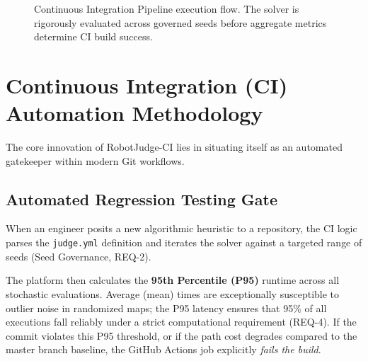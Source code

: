 \documentclass[conference]{IEEEtran}
\begin{document}
\begin{figure}[htbp]
\centering
{}
\caption{Continuous Integration Pipeline execution flow. The solver is rigorously evaluated across governed seeds before aggregate metrics determine CI build success.}
\label{fig:flowchart}
\end{figure}

\section{Continuous Integration (CI) Automation Methodology}
The core innovation of RobotJudge-CI lies in situating itself as an automated gatekeeper within modern Git workflows. 

\subsection{Automated Regression Testing Gate}
When an engineer posits a new algorithmic heuristic to a repository, the CI logic parses the \texttt{judge.yml} definition and iterates the solver against a targeted range of seeds (Seed Governance, REQ-2). 

The platform then calculates the \textbf{95th Percentile (P95)} runtime across all stochastic evaluations. Average (mean) times are exceptionally susceptible to outlier noise in randomized maps; the P95 latency ensures that 95\% of all executions fall reliably under a strict computational requirement (REQ-4). If the commit violates this P95 threshold, or if the path cost degrades compared to the master branch baseline, the GitHub Actions job explicitly \textit{fails the build}.
\end{document}
